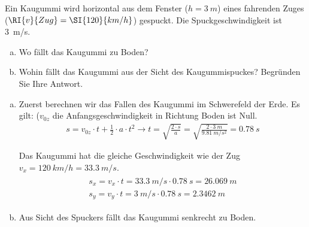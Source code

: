 
\begin{aufgabe}
	Ein Kaugummi wird horizontal aus dem Fenster ($h=\SI{3}{m}$) eines fahrenden Zuges ($\RI{v}{Zug}=\SI{120}{km/h}$) gespuckt.
Die Spuckgeschwindigkeit ist \SI{3}{m/s}.
\begin{enumerate}[a)]
	\item Wo fällt das Kaugummi zu Boden?
	\item Wohin fällt das Kaugummi aus der Sicht des Kaugummispuckes?
		Begründen Sie Ihre Antwort.
\end{enumerate}



\begin{loesung}
	\begin{enumerate}[a)]
		\item 
Zuerst berechnen wir das Fallen des Kaugummi im Schwerefeld der Erde.
Es gilt: ($v_{0z}$ die Anfangsgeschwindigkeit in Richtung Boden ist Null.
\begin{eqnarray*}
s=v_{0z}\cdot t + \frac{1}{2}\cdot a\cdot t^2 \to t=\sqrt{\frac{2\cdot s}{a}}=\sqrt{\frac{2\cdot \SI{3}{m}}{\SI{9.81}{m/s^2}}}=\SI{0.78}{s}
\end{eqnarray*}

Das Kaugummi hat die gleiche Geschwindigkeit wie der Zug $v_x=\SI{120}{km/h}=\SI{33.3}{m/s}$.
\begin{eqnarray*}
	\begin{split}
    s_x=v_x\cdot t= \SI{33.3}{m/s}\cdot\SI{0.78}{s}=\SI{26.069}{m}\\
    s_y=v_y\cdot t =\SI{3}{m/s}\cdot \SI{0.78}{s}=\SI{2.3462}{m}
	\end{split}
\end{eqnarray*}
\item Aus Sicht des Spuckers fällt das Kaugummi senkrecht zu Boden. 
	\end{enumerate}

\end{loesung}
\end{aufgabe}
